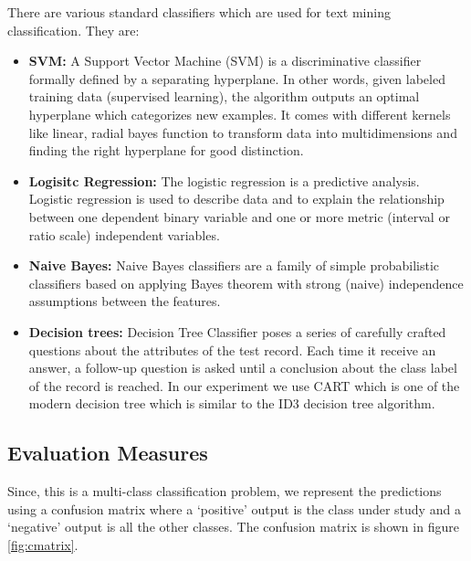 \documentclass{article} %
\begin{document}
There are various standard classifiers which are used for text mining classification. They are:
\begin{itemize}
    \item \textbf{SVM:} A Support Vector Machine (SVM) is a discriminative classifier formally defined by a separating hyperplane. In other words, given labeled training data (supervised learning), the algorithm outputs an optimal hyperplane which categorizes new examples. It comes with different kernels like linear, radial bayes function to transform data into multidimensions and finding the right hyperplane for good distinction.
    \item \textbf{Logisitc Regression:} The logistic regression is a predictive analysis. Logistic regression is used to describe data and to explain the relationship between one dependent binary variable and one or more metric (interval or ratio scale) independent variables.
    \item \textbf{Naive Bayes:} Naive Bayes classifiers are a family of simple probabilistic classifiers based on applying Bayes theorem with strong (naive) independence assumptions between the features.
    \item \textbf{Decision trees:} Decision Tree Classifier poses a series of carefully crafted questions about the attributes of the test record. Each time  it receive an answer, a follow-up question is asked until a conclusion about the class label of the record is reached. In our experiment we use CART\cite{olshen1984classification} which is one of the modern decision tree which is similar to  the ID3 decision tree algorithm.
\end{itemize}

\subsection{Evaluation Measures}
\label{evaluation}

Since, this is a multi-class classification problem, we represent the predictions using a confusion matrix where a `positive' output is the class under study and a `negative' output is all the other classes. The confusion matrix is shown in figure \ref{fig:cmatrix}.
\end{document}
